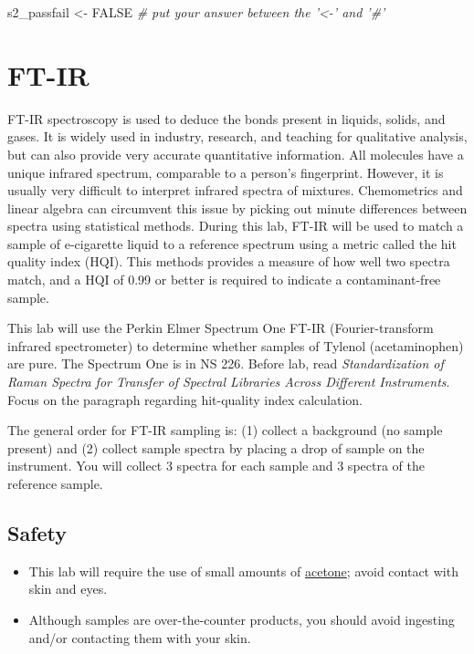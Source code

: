 \documentclass[]{tufte-book}
\newenvironment{Shaded}{}{}
\newcommand{\CommentTok}[1]{\textcolor[rgb]{0.38,0.63,0.69}{\textit{#1}}}
\newcommand{\NormalTok}[1]{#1}
\newcommand{\OtherTok}[1]{\textcolor[rgb]{0.00,0.44,0.13}{#1}}
\newcommand{\StringTok}[1]{\textcolor[rgb]{0.25,0.44,0.63}{#1}}
\providecommand{\tightlist}{%
  \setlength{\itemsep}{0pt}\setlength{\parskip}{0pt}}
\begin{document}
\begin{Shaded}
\begin{Highlighting}[]
\NormalTok{s2_passfail <-}\StringTok{ }\OtherTok{FALSE}     \CommentTok{# put your answer between the '<-' and '#'}
\end{Highlighting}
\end{Shaded}

\newpage

\hypertarget{ft-ir}{%
\section{FT-IR}\label{ft-ir}}

FT-IR spectroscopy is used to deduce the bonds present in liquids, solids, and gases. It is widely used in industry, research, and teaching for qualitative analysis, but can also provide very accurate quantitative information. All molecules have a unique infrared spectrum, comparable to a person's fingerprint. However, it is usually very difficult to interpret infrared spectra of mixtures. Chemometrics and linear algebra can circumvent this issue by picking out minute differences between spectra using statistical methods. During this lab, FT-IR will be used to match a sample of e-cigarette liquid to a reference spectrum using a metric called the hit quality index (HQI). This methods provides a measure of how well two spectra match, and a HQI of 0.99 or better is required to indicate a contaminant-free sample.

This lab will use the Perkin Elmer Spectrum One FT-IR (Fourier-transform infrared spectrometer) to determine whether samples of Tylenol (acetaminophen) are pure. The Spectrum One is in NS 226. Before lab, read \emph{Standardization of Raman Spectra for Transfer of Spectral Libraries Across Different Instruments}. Focus on the paragraph regarding hit-quality index calculation.

The general order for FT-IR sampling is: (1) collect a background (no sample present) and (2) collect sample spectra by placing a drop of sample on the instrument. You will collect 3 spectra for each sample and 3 spectra of the reference sample.

\hypertarget{safety-3}{%
\subsection*{Safety}\label{safety-3}}

\begin{itemize}
\tightlist
\item
  This lab will require the use of small amounts of \href{http://www.sciencelab.com/msds.php?msdsId=9927062}{acetone}; avoid contact with skin and eyes.
\item
  Although samples are over-the-counter products, you should avoid ingesting and/or contacting them with your skin.
\end{itemize}
\end{document}
